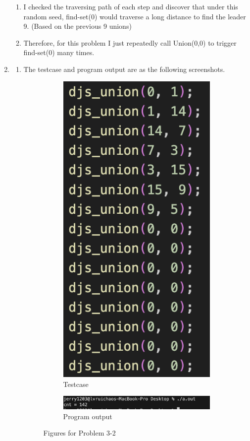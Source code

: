 \documentclass{article}
\begin{document}
\begin{CJK*}{UTF8}{bsmi}
\begin{enumerate}
\begin{enumerate}
    \item I checked the traversing path of each step and discover that under this random seed, find-set(0) would traverse a long distance to find the leader 9. (Based on the previous 9 unions)
    \item Therefore, for this problem I just repeatedly call Union(0,0) to trigger find-set(0) many times.
    \end{enumerate}
    \item\begin{enumerate}
        \item  The testcase and program output are as the following screenshots. 
        \begin{figure}[H]
        \centering
    \begin{subfigure}{.5\textwidth}
      \centering
      \includegraphics[width=.3\linewidth]{testcase.png}
      \caption{Testcase}
      \label{fig:sub1}
    \end{subfigure}%
    \begin{subfigure}{.5\textwidth}
      \centering
      \includegraphics[width=1.2\linewidth]{result.png}
      \caption{Program output}
      \label{fig:sub2}
    \end{subfigure}
    \caption{Figures for Problem 3-2}
    \label{fig:test}
    \end{figure}
    

\end{enumerate}
\end{enumerate}
\end{CJK*}
\end{document}
